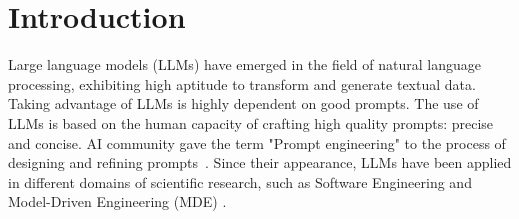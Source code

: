 \section{Introduction}
\label{intro}


Large language models (LLMs) have emerged in the field of natural language processing, exhibiting high aptitude to transform and generate textual data. 
Taking advantage of LLMs is highly dependent on good prompts. The use of LLMs is based on the human capacity of crafting high quality prompts: precise and concise. AI community gave the term "Prompt engineering" to the process of designing and refining prompts~\cite{clariso2023model}.
Since their appearance, LLMs have been applied in different domains of scientific research, such as Software Engineering and Model-Driven Engineering (MDE) \cite{10109345,AbukhalafHK23,liu2023improving,hou2023large,pearce2022asleep,sobania2022choose,ziegler2022productivity,vaithilingam2022expectation,nguyen2022empirical,doderlein2022piloting,
nathalia2023artificial,yeticstiren2023evaluating,guo2023exploring,fu2023chatgpt,kabir2023empirical,chaaben2023towards,camara2023assessment,AbukhalafHK23}.

